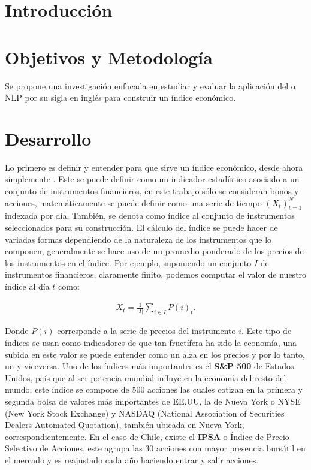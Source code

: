 \documentclass{article}
\begin{document}
\section{Introducción}

\section{Objetivos y Metodología}
    Se propone una investigación enfocada en estudiar y evaluar la aplicación del 
    o NLP por su sigla en inglés para construir un índice económico.

\section{Desarrollo}
    Lo primero es definir y entender para que sirve un índice económico, desde ahora simplemente . Este se puede definir como un indicador estadístico asociado a un conjunto de instrumentos financieros, en este trabajo sólo se consideran bonos y acciones, matemáticamente se puede definir como una serie de tiempo $(X_t)_{t=1}^{N}$ indexada por día. También, se denota como índice al conjunto de instrumentos seleccionados para su construcción. El cálculo del índice se puede hacer de variadas formas dependiendo de la naturaleza de los instrumentos que lo componen, generalmente se hace uso de un promedio ponderado de los precios de los instrumentos en el índice. Por ejemplo, suponiendo un conjunto $I$ de
    instrumentos financieros, claramente finito, podemos computar el valor de nuestro índice al día $t$ como:
    
    \begin{align*}
    	X_t = \frac{1}{|I|}\sum_{i \in I} P(i)_t.
    \end{align*}
    
   	Donde $P(i)$ corresponde a la serie de precios del instrumento $i$. Este tipo de índices se usan como indicadores de que tan fructífera ha sido la economía, una subida en este valor se puede entender como un alza en los precios y por lo tanto, un  y viceversa. Uno de los índices más importantes es el \textbf{S\&}\textbf{P 500} de Estados Unidos, país que al ser potencia mundial influye en la economía del resto del mundo, este índice se compone de $500$ acciones las cuales cotizan en la primera y segunda bolsa de valores más importantes de EE.UU, la de Nueva York o NYSE (New York Stock Exchange) y NASDAQ (National Association of Securities Dealers Automated Quotation), también ubicada en Nueva York, correspondientemente. En el caso de Chile, existe el \textbf{IPSA} o Índice de Precio Selectivo de Acciones, este agrupa las $30$ acciones con mayor presencia bursátil en el mercado y es reajustado cada año haciendo entrar y salir acciones.
    
\end{document}
